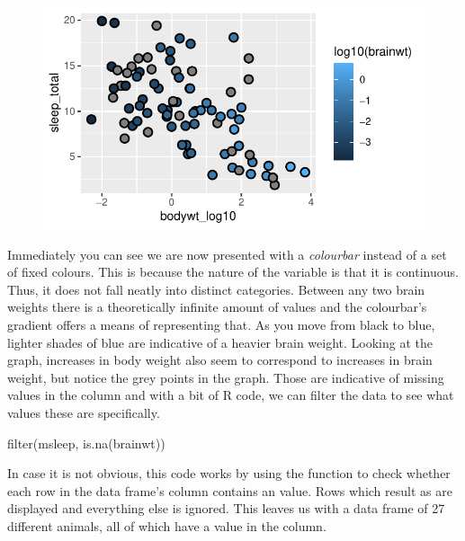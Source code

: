 \begin{figure}[H]
\includegraphics[scale = .75]{graphics/ch2Figs/ggEx_26.pdf}
\end{figure}

Immediately you can see we are now presented with a \textit{colourbar} instead of a set of fixed colours. This is because the nature of the variable  is that it is continuous. Thus, it does not fall neatly into distinct categories.  Between any two brain weights there is a theoretically infinite amount of values and the colourbar's gradient offers a means of representing that. As you move from black to blue, lighter shades of blue are indicative of a heavier brain weight. Looking at the graph, increases in body weight also seem to correspond to increases in brain weight, but notice the grey points in the graph.  Those are indicative of missing values in the  column and with a bit of R code, we can filter the data to see what values these are specifically.

\begin{inR}
filter(msleep, is.na(brainwt))
\end{inR}

\vspace{1em}

In case it is not obvious, this code works by using the  function to check whether each row in the  data frame's   column contains an  value. Rows which result as  are displayed and everything else is ignored. This leaves us with a data frame of 27 different animals, all of which have a  value in the  column.


